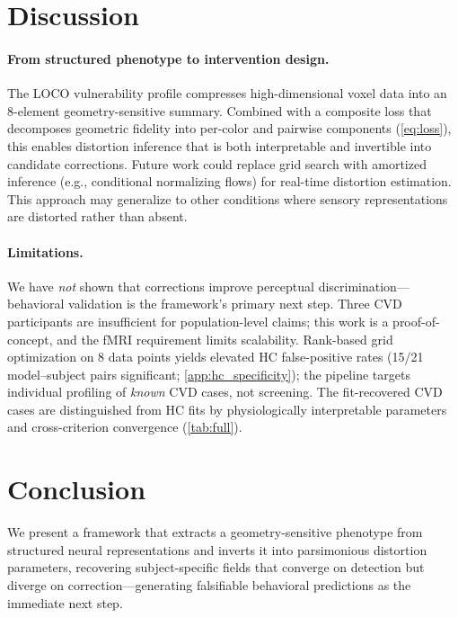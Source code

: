 \documentclass{article}
\begin{document}
\section{Discussion}
\label{sec:discussion}

\paragraph{From structured phenotype to intervention design.}
The LOCO vulnerability profile compresses high-dimensional voxel data into an 8-element geometry-sensitive summary.
Combined with a composite loss that decomposes geometric fidelity into per-color and pairwise components (\cref{eq:loss}), this enables distortion inference that is both interpretable and invertible into candidate corrections.
Future work could replace grid search with amortized inference (e.g., conditional normalizing flows) for real-time distortion estimation.
This approach may generalize to other conditions where sensory representations are distorted rather than absent.

\paragraph{Limitations.}
We have \emph{not} shown that corrections improve perceptual discrimination---behavioral validation is the framework's primary next step.
Three CVD participants are insufficient for population-level claims; this work is a proof-of-concept, and the fMRI requirement limits scalability.
Rank-based grid optimization on 8 data points yields elevated HC false-positive rates (15/21 model--subject pairs significant; \cref{app:hc_specificity}); the pipeline targets individual profiling of \emph{known} CVD cases, not screening.
The fit-recovered CVD cases are distinguished from HC fits by physiologically interpretable parameters and cross-criterion convergence (\cref{tab:full}).


\section{Conclusion}
\label{sec:conclusion}

We present a framework that extracts a geometry-sensitive phenotype from structured neural representations and inverts it into parsimonious distortion parameters, recovering subject-specific fields that converge on detection but diverge on correction---generating falsifiable behavioral predictions as the immediate next step.
\end{document}
